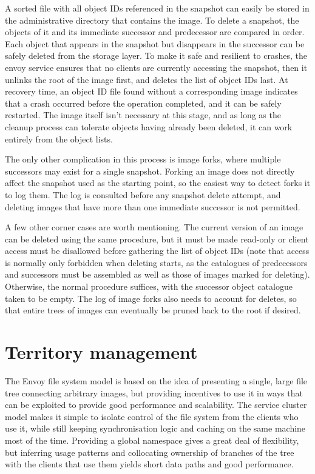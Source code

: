 A sorted file with all object IDs referenced in the snapshot can easily be stored in the administrative directory that contains the image. To delete a snapshot, the objects of it and its immediate successor and predecessor are compared in order. Each object that appears in the snapshot but disappears in the successor can be safely deleted from the storage layer. To make it safe and resilient to crashes, the envoy service ensures that no clients are currently accessing the snapshot, then it unlinks the root of the image first, and deletes the list of object IDs last. At recovery time, an object ID file found without a corresponding image indicates that a crash occurred before the operation completed, and it can be safely restarted. The image itself isn't necessary at this stage, and as long as the cleanup process can tolerate objects having already been deleted, it can work entirely from the object lists.

The only other complication in this process is image forks, where multiple successors may exist for a single snapshot. Forking an image does not directly affect the snapshot used as the starting point, so the easiest way to detect forks it to log them. The log is consulted before any snapshot delete attempt, and deleting images that have more than one immediate successor is not permitted.

A few other corner cases are worth mentioning. The current version of an image can be deleted using the same procedure, but it must be made read-only or client access must be disallowed before gathering the list of object IDs (note that access is normally only forbidden when deleting starts, as the catalogues of predecessors and successors must be assembled as well as those of images marked for deleting). Otherwise, the normal procedure suffices, with the successor object catalogue taken to be empty. The log of image forks also needs to account for deletes, so that entire trees of images can eventually be pruned back to the root if desired.

\section{Territory management}\label{sec:territory-management}

The Envoy file system model is based on the idea of presenting a single, large file tree connecting arbitrary images, but providing incentives to use it in ways that can be exploited to provide good performance and scalability. The service cluster model makes it simple to isolate control of the file system from the clients who use it, while still keeping synchronisation logic and caching on the same machine most of the time. Providing a global namespace gives a great deal of flexibility, but inferring usage patterns and collocating ownership of branches of the tree with the clients that use them yields short data paths and good performance.

